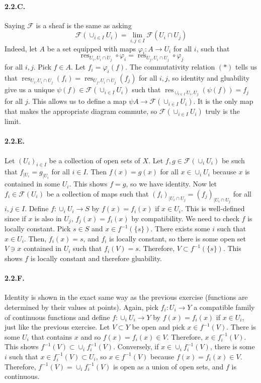 \documentclass{article}
\DeclareMathOperator{\res}{res}
\newcommand{\Fsheaf}{\mathscr{F}}
\begin{document}
\paragraph{2.2.C.} Saying $\Fsheaf$ is a sheaf is the same as asking
\[\Fsheaf(\cup_{i\in I} U_i) = \lim_{i,j \in I} \Fsheaf (U_i \cap U_j)\]
Indeed, let $A$ be a set equipped with maps $\varphi_i : A \to U_i$ for all $i$, such that
\[\res_{U_i, U_i \cap U_j} \circ \varphi_i = \res_{U_j, U_i \cap U_j} \circ \varphi_j \tag{$*$}\]
for all $i,j$. Pick $f \in A$. Let $f_i = \varphi_i (f)$. The commutativity relation $(*)$ tells us that $\res_{U_i, U_i \cap U_j} (f_i) = \res_{U_j, U_i \cap U_j} (f_j)$ for all $i,j$, so identity and gluability give us a unique $\psi(f) \in \Fsheaf(\cup_{i\in I} U_i)$ such that $\res_{\cup_{i\in I} U_i, U_j} (\psi(f)) = f_j$ for all $j$. This allows us to define a map $\psi A \to \Fsheaf (\cup_{i\in I} U_i)$. It is the only map that makes the appropriate diagram commute, so $\Fsheaf(\cup_{i\in I} U_i)$ truly is the limit.

\paragraph{2.2.E.} Let $(U_i)_{i\in I}$ be a collection of open sets of $X$. Let $f,g \in \Fsheaf(\cup_i U_i)$ be such that $f_{\mid U_i} = g_{\mid U_i}$ for all $i \in I$. Then $f(x) = g(x)$ for all $x \in \cup_i U_i$ because $x$ is contained in some $U_i$. This shows $f = g$, so we have identity. Now let $f_i \in \Fsheaf(U_i)$ be a collection of maps such that $(f_i)_{\mid U_i \cap U_j} = (f_j)_{\mid U_i \cap U_j}$ for all $i,j \in I$. Define $f : \cup_i U_i \to S$ by $f(x) = f_i (x)$ if $x \in U_i$. This is well-defined since if $x$ is also in $U_j$, $f_j(x) = f_i(x)$ by compatibility. We need to check $f$ is locally constant. Pick $s \in S$ and $x \in f^{-1}(\{s\})$. There exists some $i$ such that $x \in U_i$. Then, $f_i(x) = s$, and $f_i$ is locally constant, so there is some open set $V  \ni x$ contained in $U_i$ such that $f_i(V) = s$. Therefore, $V \subset f^{-1}(\{s\})$. This shows $f$ is locally constant and therefore gluability.

\paragraph{2.2.F.} Identity is shown in the exact same way as the previous exercise (functions are determined by their values at points). Again, pick $f_i : U_i \to Y$ a compatible family of continuous functions and define $f : \cup_i U_i \to Y$ by $f(x) = f_i(x)$ if $x \in U_i$, just like the previous exercise. Let $V \subset Y$ be open and pick $x \in f^{-1}(V)$. There is some $U_i$ that contains $x$ and so $f(x) = f_i(x) \in V$. Therefore, $x \in f_i^{-1}(V)$. This shows $f^{-1}(V) \subset \cup_i f_i^{-1}(V)$. Conversely, if $x \in \cup_i f_i^{-1}(V)$, there is some $i$ such that $x \in f_i^{-1}(V) \subset U_i$, so $x \in f^{-1}(V)$ because $f(x) = f_i(x) \in V$. Therefore, $f^{-1}(V) = \cup_i f_i^{-1}(V)$ is open as a union of open sets, and $f$ is continuous.
\end{document}
